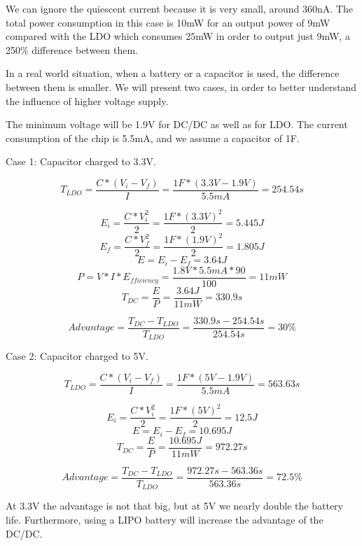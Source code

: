 We can ignore the quiescent current because it is very small, around 360nA. The total power
consumption in this case is 10mW for an output power of 9mW compared with the LDO which consumes
25mW in order to output just 9mW, a 250\% difference between them.

In a real world situation, when a battery or a capacitor is used, the difference between them is
smaller. We will present two cases, in order to better understand the influence of higher
voltage supply.

The minimum voltage will be 1.9V for DC/DC as well as for LDO. The current consumption of the chip is
5.5mA, and we assume a capacitor of 1F.

Case 1: Capacitor charged to 3.3V.

$$T_{LDO} = \frac{C * (V_i - V_f)}{I}=\frac{1F * (3.3V - 1.9V)}{5.5mA} = 254.54s $$

$$E_i = \frac{C*V_i^2}{2} = \frac{1F*(3.3V)^2}{2} =5.445J$$
$$E_f = \frac{C*V_f^2}{2} = \frac{1F*(1.9V)^2}{2} =1.805J$$
$$E = E_i - E_f = 3.64J$$
$$P = V*I*E_{fficiency }= \frac{1.8V * 5.5mA * 90}{100} = 11mW$$
$$T_{DC} = \frac{E}{P} = \frac{3.64J}{11mW} = 330.9s $$

$$Advantage = \frac{T_{DC} - T_{LDO}}{T_{LDO}} = \frac{330.9s - 254.54s}{254.54s} = 30\%$$

Case 2: Capacitor charged to 5V.

$$T_{LDO} = \frac{C * (V_i - V_f)}{I}=\frac{1F * (5V - 1.9V)}{5.5mA} = 563.63s $$

$$E_i = \frac{C*V_i^2}{2} = \frac{1F*(5V)^2}{2} =12.5J$$
$$E = E_i - E_f = 10.695J$$
$$T_{DC} = \frac{E}{P} = \frac{10.695J}{11mW} = 972.27s $$

$$Advantage = \frac{T_{DC} - T_{LDO}}{T_{LDO}} = \frac{972.27s - 563.36s}{563.36s} = 72.5\%$$

At 3.3V the advantage is not that big, but at 5V we nearly double the battery life. Furthermore, using a LIPO
battery will increase the advantage of the DC/DC.


